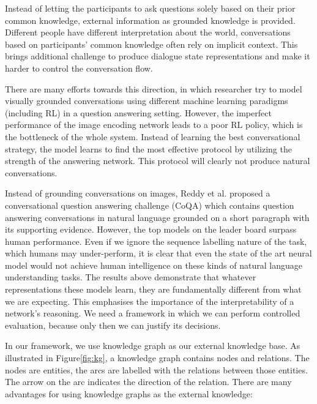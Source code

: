 \documentclass[bsc,frontabs,twoside,singlespacing,parskip,deptreport]{infthesis}     %
\begin{document}
Instead of letting the participants to ask questions solely based on their prior common knowledge, external information as grounded knowledge is provided. Different people have different interpretation about the world, conversations based on participants' common knowledge often rely on implicit context. This brings additional challenge to produce dialogue state representations and make it harder to control the conversation flow.

There are many efforts towards this direction, in which researcher\cite{strub2017end,shekhar2017foil,reddy2019coqa,zhou2018dataset,de2017guesswhat,das2017visual,das2017learning} try to model visually grounded conversations using different machine learning paradigms (including RL) in a question answering setting. However, the imperfect performance of the image encoding network leads to a poor RL policy, which is the bottleneck of the whole system. Instead of learning the best conversational strategy, the model learns to find the most effective protocol by utilizing the strength of the answering network. This protocol will clearly not produce natural conversations. 

Instead of grounding conversations on images, Reddy et al.\cite{reddy2019coqa} proposed a conversational question answering challenge (CoQA) which contains question answering conversations in natural language grounded on a short paragraph with its supporting evidence. However, the top models on the leader board surpass human performance. Even if we ignore the sequence labelling nature of the task, which humans may under-perform, it is clear that even the state of the art neural model would not achieve human intelligence on these kinds of natural language understanding tasks. The results above demonstrate that whatever representations these models learn, they are fundamentally different from what we are expecting. This emphasises the importance of the interpretability of a network's reasoning. We need a framework in which we can perform controlled evaluation, because only then we can justify its decisions.


In our framework, we use knowledge graph as our external knowledge base. As illustrated in Figure\ref{fig:kg}, a knowledge graph contains nodes and relations. The nodes are entities, the arcs are labelled with the relations between those entities. The arrow on the arc indicates the direction of the relation. There are many advantages for using knowledge graphs as the external knowledge:
\end{document}
